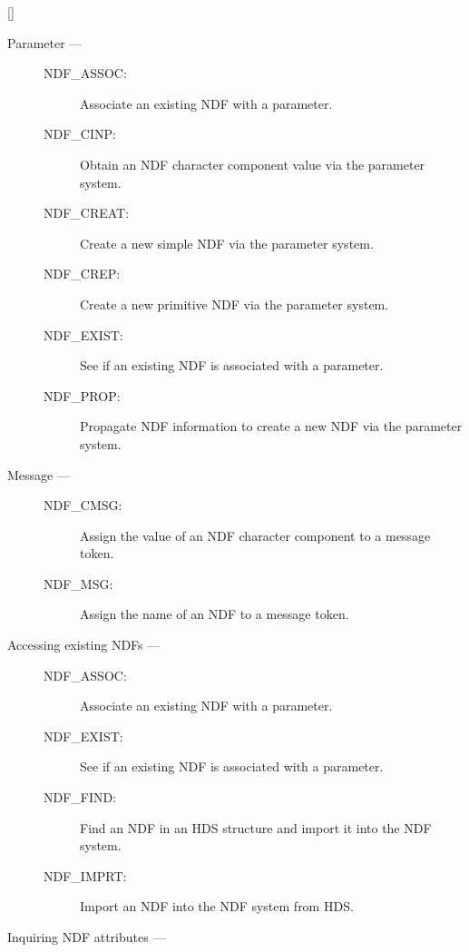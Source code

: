 \hfill []

\vspace{2mm}

\begin{description}
\item [Parameter ---]

\begin{description}
\item [NDF\_ASSOC:]  Associate an existing NDF with a parameter.
\item [NDF\_CINP:]  Obtain an NDF character component value via the parameter system.
\item [NDF\_CREAT:]  Create a new simple NDF via the parameter system.
\item [NDF\_CREP:]  Create a new primitive NDF via the parameter system.
\item [NDF\_EXIST:]  See if an existing NDF is associated with a parameter.
\item [NDF\_PROP:]  Propagate NDF information to create a new NDF via the parameter system.
\end{description}

\item [Message ---]

\begin{description}
\item [NDF\_CMSG:]  Assign the value of an NDF character component to a message token.
\item [NDF\_MSG:]  Assign the name of an NDF to a message token.
\end{description}

\item [Accessing existing NDFs ---]

\begin{description}
\item [NDF\_ASSOC:]  Associate an existing NDF with a parameter.
\item [NDF\_EXIST:]  See if an existing NDF is associated with a parameter.
\item [NDF\_FIND:]  Find an NDF in an HDS structure and import it into the NDF system.
\item [NDF\_IMPRT:]  Import an NDF into the NDF system from HDS.
\end{description}

\item [Inquiring NDF attributes ---]


\end{description}

